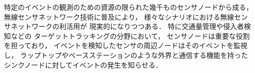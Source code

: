 %
%


特定のイベントの観測のための資源の限られた幾千ものセンサノードから成る，
無線センサネットワーク技術に普及により，
様々なシナリオにおける無線センサネットワークの利活用が
現実的になりつつある．
特に交通量管理や侵入者検知などの
ターゲットトラッキングの分野において，
センサノードは重要な役割を担っており，
イベントを検知したセンサの周辺ノードはそのイベントを監視し，
ラップトップやベースステーションのような外界と通信する機能を持った
シンクノードに対してイベントの発生を知らせる．

